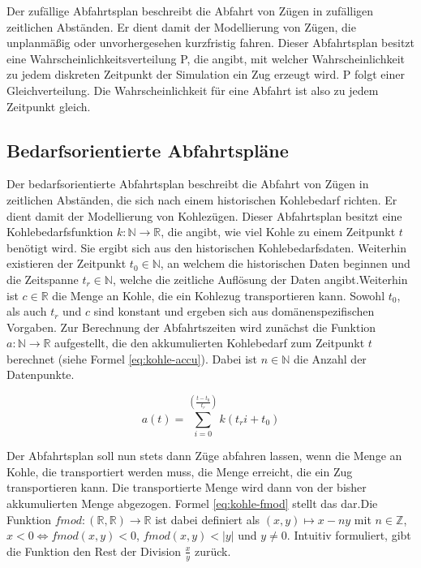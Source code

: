 Der zufällige Abfahrtsplan beschreibt die Abfahrt von Zügen in zufälligen zeitlichen Abständen. Er dient damit der Modellierung von Zügen, die unplanmäßig oder unvorhergesehen kurzfristig fahren. Dieser Abfahrtsplan besitzt eine Wahrscheinlichkeitsverteilung P, die angibt, mit welcher Wahrscheinlichkeit zu jedem diskreten Zeitpunkt der Simulation ein Zug erzeugt wird. P folgt einer Gleichverteilung. Die Wahrscheinlichkeit für eine Abfahrt ist also zu jedem Zeitpunkt gleich.

\subsection{Bedarfsorientierte Abfahrtspläne}

Der bedarfsorientierte Abfahrtsplan beschreibt die Abfahrt von Zügen in zeitlichen Abständen, die sich nach einem historischen Kohlebedarf richten. Er dient damit der Modellierung von Kohlezügen. Dieser Abfahrtsplan besitzt eine Kohlebedarfsfunktion $k:\mathbb{N}\to\mathbb{R}$, die angibt, wie viel Kohle zu einem Zeitpunkt $t$ benötigt wird. Sie ergibt sich aus den historischen Kohlebedarfsdaten. Weiterhin existieren der Zeitpunkt $t_0 \in \mathbb{N}$, an welchem die historischen Daten beginnen und die Zeitspanne $t_r \in \mathbb{N}$, welche die zeitliche Auflösung der Daten angibt.Weiterhin ist $c\in\mathbb{R}$ die Menge an Kohle, die ein Kohlezug transportieren kann.  Sowohl $t_0$, als auch $t_r$ und $c$ sind konstant und ergeben sich aus domänenspezifischen Vorgaben. Zur Berechnung der Abfahrtszeiten wird zunächst die Funktion $a: \mathbb{N} \to \mathbb{R}$ aufgestellt, die den akkumulierten Kohlebedarf zum Zeitpunkt $t$ berechnet (siehe Formel \ref{eq:kohle-accu}). Dabei ist $n\in\mathbb{N}$ die Anzahl der Datenpunkte.

\begin{equation}
    a(t)=\sum_{i=0}^{(\frac{t-t_0}{t_r})} k(t_ri+t_0)\label{eq:kohle-accu}
\end{equation}

Der Abfahrtsplan soll nun stets dann Züge abfahren lassen, wenn die Menge an Kohle, die transportiert werden muss, die Menge erreicht, die ein Zug transportieren kann. Die transportierte Menge wird dann von der bisher akkumulierten Menge abgezogen. Formel \ref{eq:kohle-fmod} stellt das dar.Die Funktion $fmod:(\mathbb{R},\mathbb{R}) \to \mathbb{R}$ ist dabei definiert als $(x,y)\mapsto x-ny$ mit $n\in\mathbb{Z}$, $x<0\Leftrightarrow fmod(x,y)<0$, $fmod(x,y)<|y|$ und $y\neq 0$. Intuitiv formuliert, gibt die Funktion den Rest der Division $\frac{x}{y}$ zurück.

